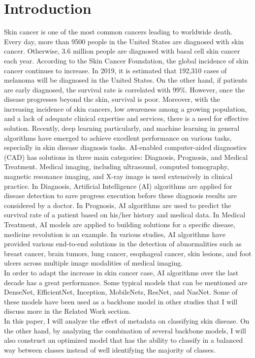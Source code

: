 \section{Introduction}
Skin cancer is one of the most common cancers leading to worldwide death. Every day, more than 9500\cite{03358} people in the United States are diagnosed with skin cancer. Otherwise, 3.6\cite{03358} million people are diagnosed with basal cell skin cancer each year. According to the Skin Cancer Foundation, the global incidence of skin cancer continues to increase\cite{11872}. In 2019, it is estimated that 192,310 cases of melanoma will be diagnosed in the United States\cite{11872}. On the other hand, if patients are early diagnosed, the survival rate is correlated with 99\%. However, once the disease progresses beyond the skin, survival is poor\cite{11872}. Moreover, with the increasing incidence of skin cancers, low awareness among a growing population, and a lack of adequate clinical expertise and services, there is a need for effective solution. \newline
Recently, deep learning particularly, and machine learning in general algorithms have emerged to achieve excellent performance on various tasks, especially in skin disease diagnosis tasks. AI-enabled computer-aided diagnostics (CAD) has solutions in three main categories: Diagnosis, Prognosis, and Medical Treatment. Medical imaging, including ultrasound, computed tomography, magnetic resonance imaging, and X-ray image is used extensively in clinical practice. In Diagnosis, Artificial Intelligence (AI) algorithms are applied for disease detection to save progress execution before these diagnosis results are considered by a doctor. In Prognosis, AI algorithms are used to predict the survival rate of a patient based on his/her history and medical data. In Medical Treatment, AI models are applied to building solutions for a specific disease, medicine revolution is an example. In various studies, AI algorithms have provided various end-to-end solutions in the detection of abnormalities such as breast cancer, brain tumors, lung cancer, esophageal cancer, skin lesions, and foot ulcers across multiple image modalities of medical imaging\cite{11872}. \\
In order to adapt the increase in skin cancer case, AI algorithms over the last decade has a great performance. Some typical models that can be mentioned are DenseNet\cite{06993}, EfficientNet\cite{04861}, Inception\cite{00567}, MobileNets\cite{04861}\cite{04381}\cite{02244}, ResNet\cite{03385}\cite{05027}, and NasNet\cite{07012}. Some of these models have been used as a backbone model in other studies that I will discuss more in the Related Work section. \\
In this paper, I will analyze the effect of metadata on classifying skin disease. On the other hand, by analyzing the combination of several backbone models, I will also construct an optimized model that has the ability to classify in a balanced way between classes instead of well identifying the majority of classes. 

